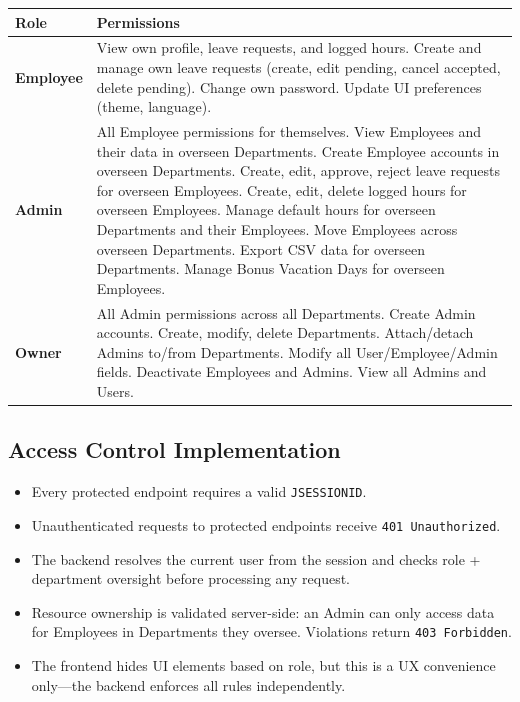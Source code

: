\documentclass[11pt,a4paper]{article}
\begin{document}
\begin{longtable}{p{2.5cm} p{11cm}}
\toprule
\textbf{Role} & \textbf{Permissions} \\
\midrule
\textbf{Employee} &
    View own profile, leave requests, and logged hours.
    Create and manage own leave requests (create, edit pending, cancel accepted, delete pending).
    Change own password.
    Update UI preferences (theme, language). \\
\midrule
\textbf{Admin} &
    All Employee permissions for themselves.
    View Employees and their data in overseen Departments.
    Create Employee accounts in overseen Departments.
    Create, edit, approve, reject leave requests for overseen Employees.
    Create, edit, delete logged hours for overseen Employees.
    Manage default hours for overseen Departments and their Employees.
    Move Employees across overseen Departments.
    Export CSV data for overseen Departments.
    Manage Bonus Vacation Days for overseen Employees. \\
\midrule
\textbf{Owner} &
    All Admin permissions across all Departments.
    Create Admin accounts.
    Create, modify, delete Departments.
    Attach/detach Admins to/from Departments.
    Modify all User/Employee/Admin fields.
    Deactivate Employees and Admins.
    View all Admins and Users. \\
\bottomrule
\end{longtable}

\subsection{Access Control Implementation}

\begin{itemize}[leftmargin=1.5em]
    \item Every protected endpoint requires a valid \texttt{JSESSIONID}.
    \item Unauthenticated requests to protected endpoints receive \texttt{401 Unauthorized}.
    \item The backend resolves the current user from the session and checks role + department oversight before processing any request.
    \item Resource ownership is validated server-side: an Admin can only access data for Employees in Departments they oversee. Violations return \texttt{403 Forbidden}.
    \item The frontend hides UI elements based on role, but this is a UX convenience only---the backend enforces all rules independently.
\end{itemize}
\end{document}
